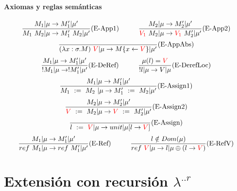 \documentclass[10pt,a4paper]{article}
\begin{document}
\paragraph{Axiomas y reglas semánticas}
\begin{equation*}
\frac{M_1|\mu\to M'_1|\mu'}{M_1~M_2|\mu\to M'_1~M_2|\mu'}(\text{E-App1})\hspace*{1cm}\frac{M_2|\mu\to M'_2|\mu'}{\color{red}V_1\color{black}~M_2|\mu\to \color{red}V_1\color{black}~M'_2|\mu'}(\text{E-App2})
\end{equation*}
\vspace*{5mm}
\begin{equation*}
\frac{}{(\lambda x: \sigma . M)~\color{red}V\color{black}|\mu\to M\{x\leftarrow\color{red}V\color{black}\}|\mu'}(\text{E-AppAbs})
\end{equation*}
\vspace*{5mm}
\begin{equation*}
\frac{M_1|\mu\to M'_1|\mu'}{!M_1|\mu\to !M_1'|\mu'}(\text{E-DeRef})\hspace*{1cm}
\frac{\mu(l) = \color{red}V\color{black}}{!l|\mu\to V|\mu}(\text{E-DerefLoc})
\end{equation*}
\vspace*{5mm}
\begin{equation*}
\frac{M_1|\mu\to M'_1|\mu'}{M_1~:=~M_2~|\mu\to M'_1~:=~M_2|\mu'}(\text{E-Assign1})
\end{equation*}
\vspace*{5mm}
\begin{equation*}
\frac{M_2|\mu\to M'_2|\mu'}{\color{red}V\color{black}~:=~M_2|\mu\to \color{red}V\color{black}~:=~M'_2|\mu'}(\text{E-Assign2})
\end{equation*}
\vspace*{5mm}
\begin{equation*}
\frac{}{l~:=~\color{red}V\color{black}|\mu\to unit|\mu[l\to \color{red}V\color{black}]}(\text{E-Assign})
\end{equation*}
\vspace*{5mm}
\begin{equation*}
\frac{M_1|\mu\to M'_1|\mu'}{ref~M_1|\mu\to ref~M'_1|\mu'}(\text{E-Ref})\hspace*{1cm}
\frac{l\notin Dom(\mu)}{ref~\color{red}V\color{black}|\mu\to l|\mu\oplus(l\to \color{red}V\color{black})}(\text{E-RefV})
\end{equation*}

\newpage
\section{Extensión con recursión $\lambda^{..r}$}
\end{document}
